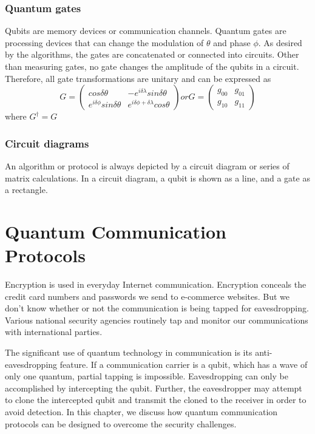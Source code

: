 \documentclass[oneside, letter, 12pt]{book}
\begin{document}
\subsection{Quantum gates}
Qubits are memory devices or communication channels. Quantum gates are processing devices that can change the modulation of $\theta$ and phase $\phi$. As desired by the algorithms, the gates are concatenated or connected into circuits. Other than measuring gates, no gate changes the amplitude of the qubits in a circuit. Therefore, all gate transformations are unitary and can be expressed as
\begin{equation}
G=
    \begin{pmatrix}
        cos\delta \theta & -e^{i\delta \lambda} sin\delta \theta \\
        e^{i \delta \phi} sin\delta \theta & e^{i \delta \phi+ \delta \lambda} cos\theta 
    \end{pmatrix} or
G=   \begin{pmatrix}
        g_{00} & g_{01} \\
        g_{10} & g_{11} 
    \end{pmatrix}
\end{equation}
where $G^\dagger = G$


\subsection{Circuit diagrams}
An algorithm or protocol is always depicted by a circuit diagram or series of matrix calculations. In a circuit diagram, a qubit is shown as a line, and a gate as a rectangle.

\chapter{Quantum Communication Protocols}\label{c-comm}
Encryption is used in everyday Internet communication. Encryption conceals the credit card numbers and passwords we send to e-commerce websites. But we don't know whether or not the communication is being tapped for eavesdropping. Various national security agencies routinely tap and monitor our communications with international parties.

The significant use of quantum technology in communication is its anti-eavesdropping feature. If a communication carrier is a qubit, which has a wave of only one quantum, partial tapping is impossible. Eavesdropping can only be accomplished by intercepting the qubit. Further, the eavesdropper may attempt to clone the intercepted qubit and transmit the cloned to the receiver in order to avoid detection. In this chapter, we discuss how quantum communication protocols can be designed to overcome the security challenges.
\end{document}

